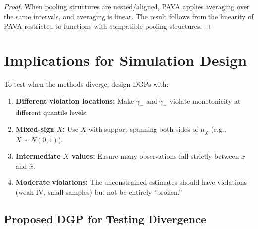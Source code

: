 \documentclass[12pt]{article}
\begin{document}
\begin{proof}
When pooling structures are nested/aligned, PAVA applies averaging over the same intervals, and averaging is linear. The result follows from the linearity of PAVA restricted to functions with compatible pooling structures.
\end{proof}

\section{Implications for Simulation Design}

To test when the methods diverge, design DGPs with:

\begin{enumerate}
\item \textbf{Different violation locations:} Make $\tilde{\gamma}_-$ and $\tilde{\gamma}_+$ violate monotonicity at different quantile levels.

\item \textbf{Mixed-sign $X$:} Use $X$ with support spanning both sides of $\mu_X$ (e.g., $X \sim N(0,1)$).

\item \textbf{Intermediate $X$ values:} Ensure many observations fall strictly between $\underline{x}$ and $\bar{x}$.

\item \textbf{Moderate violations:} The unconstrained estimates should have violations (weak IV, small samples) but not be entirely ``broken.''
\end{enumerate}

\subsection{Proposed DGP for Testing Divergence}
\end{document}

